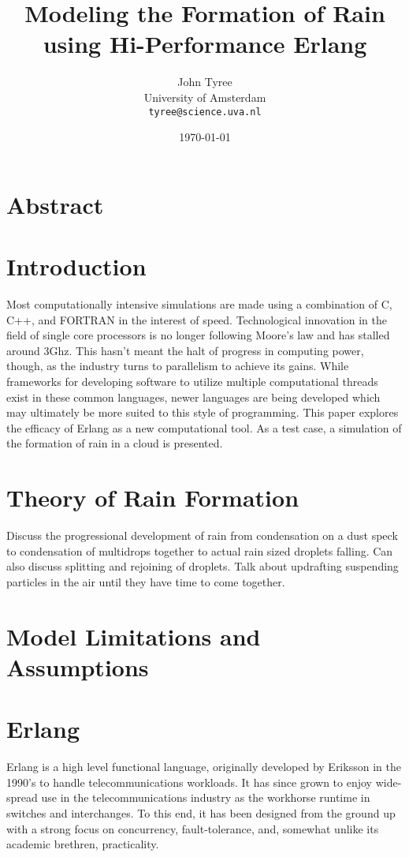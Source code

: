 \documentclass[twocolumn,a4paper,10pt]{article}
\title{Modeling the Formation of Rain using Hi-Performance Erlang}
\author{John Tyree\\
University of Amsterdam\\
\texttt{tyree@science.uva.nl}}
\date{\today}
\begin{document}
\maketitle
\section{Abstract}
\section{Introduction}
Most computationally intensive simulations are made using a combination of C, C++, and FORTRAN in the interest of speed. Technological innovation in the field of single core processors is no longer following Moore's law and has stalled around 3Ghz. This hasn't meant the halt of progress in computing power, though, as the industry turns to parallelism to achieve its gains. While frameworks for developing software to utilize multiple computational threads exist in these common languages, newer languages are being developed which may ultimately be more suited to this style of programming. This paper explores the efficacy of Erlang as a new computational tool. As a test case, a simulation of the formation of rain in a cloud is presented.

\section{Theory of Rain Formation}
Discuss the progressional development of rain from condensation on a dust speck to condensation of multidrops together to actual rain sized droplets falling.  Can also discuss splitting and rejoining of droplets. Talk about updrafting suspending particles in the air until they have time to come together.

\section{Model Limitations and Assumptions}

\section{Erlang}
Erlang is a high level functional language, originally developed by Eriksson in the 1990's to handle telecommunications workloads. It has since grown to enjoy wide-spread use in the telecommunications industry as the workhorse runtime in switches and interchanges. To this end, it has been designed from the ground up with a strong focus on concurrency, fault-tolerance, and, somewhat unlike its academic brethren, practicality.
\end{document}

